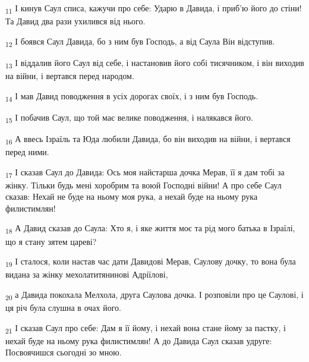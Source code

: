 \begin{tcolorbox}
\textsubscript{11} І кинув Саул списа, кажучи про себе: Ударю в Давида, і приб'ю його до стіни! Та Давид два рази ухилився від нього.
\end{tcolorbox}
\begin{tcolorbox}
\textsubscript{12} І боявся Саул Давида, бо з ним був Господь, а від Саула Він відступив.
\end{tcolorbox}
\begin{tcolorbox}
\textsubscript{13} І віддалив його Саул від себе, і настановив його собі тисячником, і він виходив на війни, і вертався перед народом.
\end{tcolorbox}
\begin{tcolorbox}
\textsubscript{14} І мав Давид поводження в усіх дорогах своїх, і з ним був Господь.
\end{tcolorbox}
\begin{tcolorbox}
\textsubscript{15} І побачив Саул, що той має велике поводження, і налякався його.
\end{tcolorbox}
\begin{tcolorbox}
\textsubscript{16} А ввесь Ізраїль та Юда любили Давида, бо він виходив на війни, і вертався перед ними.
\end{tcolorbox}
\begin{tcolorbox}
\textsubscript{17} І сказав Саул до Давида: Ось моя найстарша дочка Мерав, її я дам тобі за жінку. Тільки будь мені хоробрим та воюй Господні війни! А про себе Саул сказав: Нехай не буде на ньому моя рука, а нехай буде на ньому рука филистимлян!
\end{tcolorbox}
\begin{tcolorbox}
\textsubscript{18} А Давид сказав до Саула: Хто я, і яке життя моє та рід мого батька в Ізраїлі, що я стану зятем цареві?
\end{tcolorbox}
\begin{tcolorbox}
\textsubscript{19} І сталося, коли настав час дати Давидові Мерав, Саулову дочку, то вона була видана за жінку мехолатитянинові Адріїлові,
\end{tcolorbox}
\begin{tcolorbox}
\textsubscript{20} а Давида покохала Мелхола, друга Саулова дочка. І розповіли про це Саулові, і ця річ була слушна в очах його.
\end{tcolorbox}
\begin{tcolorbox}
\textsubscript{21} І сказав Саул про себе: Дам я її йому, і нехай вона стане йому за пастку, і нехай буде на ньому рука филистимлян! А до Давида Саул сказав удруге: Посвоячишся сьогодні зо мною.
\end{tcolorbox}
